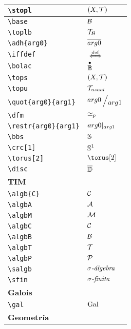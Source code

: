 \begin{longtable}{|p{3.5cm}|p{2cm}|}
\verb|\stopl| & $\displaystyle\stopl$ \\ \midrule 
\verb|\base| & $\displaystyle\base$ \\ \midrule 
\verb|\toplb| & $\displaystyle\toplb$ \\ \midrule 
\verb|\adh{arg0}| & $\displaystyle\adh{arg0}$ \\ \midrule 
\verb|\iffdef| & $\displaystyle\iffdef$ \\ \midrule 
\verb|\bolac| & $\displaystyle\bolac$ \\ \midrule 
\verb|\tops| & $\displaystyle\tops$ \\ \midrule 
\verb|\topu| & $\displaystyle\topu$ \\ \midrule 
\verb|\quot{arg0}{arg1}| & $\displaystyle\quot{arg0}{arg1}$ \\ \midrule 
\verb|\dfm| & $\displaystyle\dfm$ \\ \midrule 
\verb|\restr{arg0}{arg1}| & $\displaystyle\restr{arg0}{arg1}$ \\ \midrule 
\verb|\bbs| & $\displaystyle\bbs$ \\ \midrule 
\verb|\crc[1]| & $\displaystyle\crc[1]$ \\ \midrule 
\verb|\torus[2]| & $\displaystyle\torus[2]$ \\ \midrule 
\verb|\disc| & $\displaystyle\disc$ \\ \midrule 
\bottomrule \multicolumn{2}{|p{5.5cm}|}{\textbf{TIM}} \\ \toprule 
\verb|\algb{C}| & $\displaystyle\algb{C}$ \\ \midrule 
\verb|\algbA| & $\displaystyle\algbA$ \\ \midrule 
\verb|\algbM| & $\displaystyle\algbM$ \\ \midrule 
\verb|\algbC| & $\displaystyle\algbC$ \\ \midrule 
\verb|\algbB| & $\displaystyle\algbB$ \\ \midrule 
\verb|\algbT| & $\displaystyle\algbT$ \\ \midrule 
\verb|\algbP| & $\displaystyle\algbP$ \\ \midrule 
\verb|\salgb| & $\displaystyle\salgb$ \\ \midrule 
\verb|\sfin| & $\displaystyle\sfin$ \\ \midrule 
\bottomrule \multicolumn{2}{|p{5.5cm}|}{\textbf{Galois}} \\ \toprule 
\verb|\gal| & $\displaystyle\gal$ \\ \midrule 
\bottomrule \multicolumn{2}{|p{5.5cm}|}{\textbf{Geometría}} \\ \toprule 

\end{longtable}
